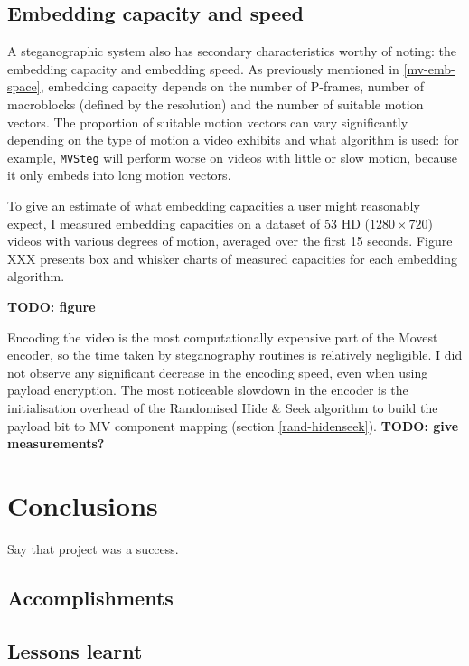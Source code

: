 \documentclass[12pt,british,twoside,notitlepage,usenames,dvipsnames,hypens,final]{report}
\numberwithin{equation}{section}
\numberwithin{figure}{section}
\begin{document}
\section{Embedding capacity and speed}

A steganographic system also has secondary characteristics worthy of noting: the embedding capacity and embedding speed. As previously mentioned in \ref{mv-emb-space}, embedding capacity depends on the number of P-frames, number of macroblocks (defined by the resolution) and the number of suitable motion vectors. The proportion of suitable motion vectors can vary significantly depending on the type of motion a video exhibits and what algorithm is used: for example, \texttt{MVSteg} will perform worse on videos with little or slow motion, because it only embeds into long motion vectors. 

To give an estimate of what embedding capacities a user might reasonably expect, I measured embedding capacities on a dataset of 53 HD ($1280 \times 720$) videos with various degrees of motion, averaged over the first 15 seconds. Figure XXX presents box and whisker charts of measured capacities for each embedding algorithm.

\textbf{TODO: figure}

Encoding the video is the most computationally expensive part of the Movest encoder, so the time taken by steganography routines is relatively negligible. I did not observe any significant decrease in the encoding speed, even when using payload encryption. The most noticeable slowdown in the encoder is the initialisation overhead of the Randomised Hide \& Seek algorithm to build the payload bit to MV component mapping (section \ref{rand-hidenseek}). \textbf{TODO: give measurements?}

\cleardoublepage
\chapter{Conclusions}

Say that project was a success.

\section{Accomplishments}

\section{Lessons learnt}
\end{document}
